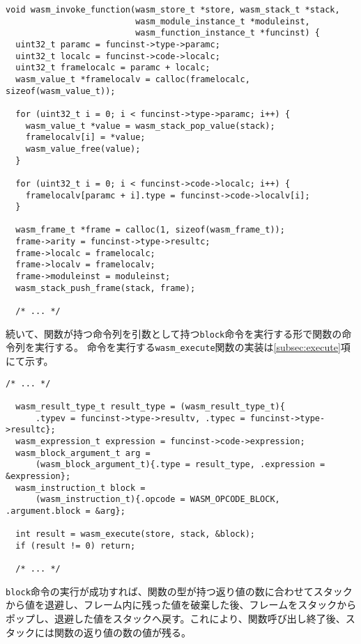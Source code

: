 \begin{lstlisting}[caption=関数の呼び出し,label=lst:parse_sleb128]
void wasm_invoke_function(wasm_store_t *store, wasm_stack_t *stack,
                          wasm_module_instance_t *moduleinst,
                          wasm_function_instance_t *funcinst) {
  uint32_t paramc = funcinst->type->paramc;
  uint32_t localc = funcinst->code->localc;
  uint32_t framelocalc = paramc + localc;
  wasm_value_t *framelocalv = calloc(framelocalc, sizeof(wasm_value_t));

  for (uint32_t i = 0; i < funcinst->type->paramc; i++) {
    wasm_value_t *value = wasm_stack_pop_value(stack);
    framelocalv[i] = *value;
    wasm_value_free(value);
  }

  for (uint32_t i = 0; i < funcinst->code->localc; i++) {
    framelocalv[paramc + i].type = funcinst->code->localv[i];
  }

  wasm_frame_t *frame = calloc(1, sizeof(wasm_frame_t));
  frame->arity = funcinst->type->resultc;
  frame->localc = framelocalc;
  frame->localv = framelocalv;
  frame->moduleinst = moduleinst;
  wasm_stack_push_frame(stack, frame);

  /* ... */
\end{lstlisting}

続いて、関数が持つ命令列を引数として持つ\verb|block|命令を実行する形で関数の命令列を実行する。
命令を実行する\verb|wasm_execute|関数の実装は\ref{subsec:execute}項にて示す。

\begin{lstlisting}[caption=関数の呼び出し,label=lst:parse_sleb128]
  /* ... */

  wasm_result_type_t result_type = (wasm_result_type_t){
      .typev = funcinst->type->resultv, .typec = funcinst->type->resultc};
  wasm_expression_t expression = funcinst->code->expression;
  wasm_block_argument_t arg =
      (wasm_block_argument_t){.type = result_type, .expression = &expression};
  wasm_instruction_t block =
      (wasm_instruction_t){.opcode = WASM_OPCODE_BLOCK, .argument.block = &arg};

  int result = wasm_execute(store, stack, &block);
  if (result != 0) return;

  /* ... */
\end{lstlisting}

\verb|block|命令の実行が成功すれば、関数の型が持つ返り値の数に合わせてスタックから値を退避し、フレーム内に残った値を破棄した後、フレームをスタックからポップし、退避した値をスタックへ戻す。これにより、関数呼び出し終了後、スタックには関数の返り値の数の値が残る。

